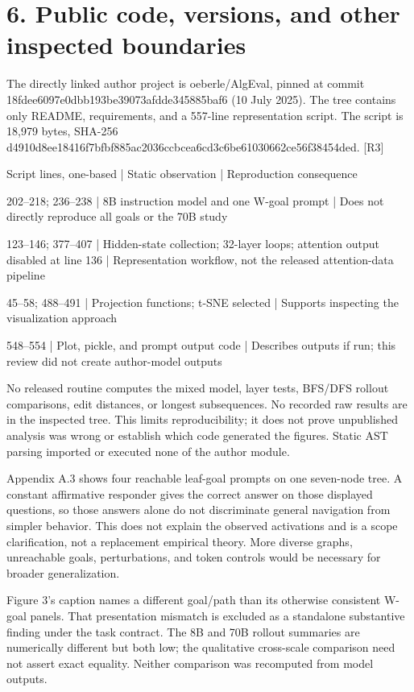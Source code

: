 \documentclass[10pt]{article}
\begin{document}
\section*{6. Public code, versions, and other inspected boundaries}
The directly linked author project is oeberle/AlgEval, pinned at commit 18fdee6097e0dbb193be39073afdde345885baf6 (10 July 2025). The tree contains only README, requirements, and a 557-line representation script. The script is 18,979 bytes, SHA-256 d4910d8ee18416f7bfbf885ac2036ccbcea6cd3c6be61030662ce56f38454ded. [R3]\par
Script lines, one-based | Static observation | Reproduction consequence\par
202–218; 236–238 | 8B instruction model and one W-goal prompt | Does not directly reproduce all goals or the 70B study\par
123–146; 377–407 | Hidden-state collection; 32-layer loops; attention output disabled at line 136 | Representation workflow, not the released attention-data pipeline\par
45–58; 488–491 | Projection functions; t-SNE selected | Supports inspecting the visualization approach\par
548–554 | Plot, pickle, and prompt output code | Describes outputs if run; this review did not create author-model outputs\par
No released routine computes the mixed model, layer tests, BFS/DFS rollout comparisons, edit distances, or longest subsequences. No recorded raw results are in the inspected tree. This limits reproducibility; it does not prove unpublished analysis was wrong or establish which code generated the figures. Static AST parsing imported or executed none of the author module.\par
Appendix A.3 shows four reachable leaf-goal prompts on one seven-node tree. A constant affirmative responder gives the correct answer on those displayed questions, so those answers alone do not discriminate general navigation from simpler behavior. This does not explain the observed activations and is a scope clarification, not a replacement empirical theory. More diverse graphs, unreachable goals, perturbations, and token controls would be necessary for broader generalization.\par
Figure 3’s caption names a different goal/path than its otherwise consistent W-goal panels. That presentation mismatch is excluded as a standalone substantive finding under the task contract. The 8B and 70B rollout summaries are numerically different but both low; the qualitative cross-scale comparison need not assert exact equality. Neither comparison was recomputed from model outputs.\par
\end{document}
